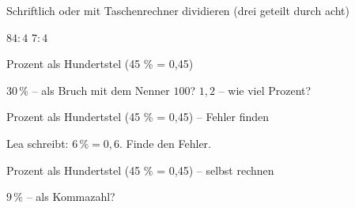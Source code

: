 \begin{aufgabe}{Schriftlich oder mit Taschenrechner dividieren (drei geteilt durch acht)}
\begin{teile}
\teil $84 : 4$
\teil $7 : 4$
\end{teile}
\end{aufgabe}

\begin{aufgabe}{Prozent als Hundertstel (45 \% = 0,45)}
\begin{teile}
\teil $30\,\%$ – als Bruch mit dem Nenner $100$?
\teil $1{,}2$ – wie viel Prozent? \leerfeld[\%]
\end{teile}
\end{aufgabe}

\begin{aufgabe}{Prozent als Hundertstel (45 \% = 0,45) – Fehler finden}
\begin{teile}
\teil Lea schreibt: $6\,\% = 0{,}6$. Finde den Fehler.
\end{teile}
\end{aufgabe}

\begin{aufgabe}{Prozent als Hundertstel (45 \% = 0,45) – selbst rechnen}
\begin{teile}
\teil $9\,\%$ – als Kommazahl?
\end{teile}
\end{aufgabe}

